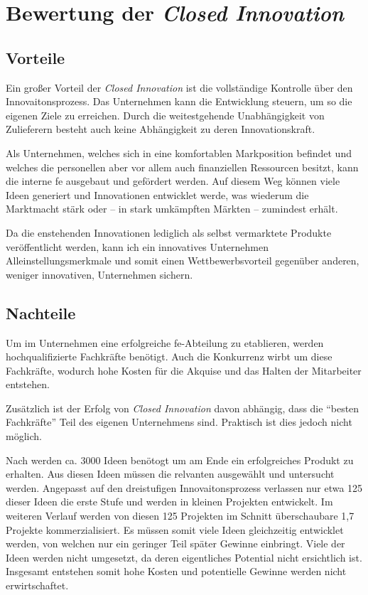 \section{Bewertung der \textit{Closed Innovation}}\label{sec:bewertung}


\subsection{Vorteile}\label{sec:bewertung-vor}
Ein großer Vorteil der \textit{Closed Innovation} ist die vollständige Kontrolle über den Innovaitonsprozess.
Das Unternehmen kann die Entwicklung steuern,
um so die eigenen Ziele zu erreichen.
Durch die weitestgehende Unabhängigkeit von Zulieferern besteht auch keine Abhängigkeit zu deren Innovationskraft.

Als Unternehmen, welches sich in eine komfortablen Markposition befindet
und welches die personellen aber vor allem auch finanziellen Ressourcen besitzt,
kann die interne \ac{fe} ausgebaut und gefördert werden.
Auf diesem Weg können viele Ideen generiert und Innovationen entwicklet werde,
was wiederum die Marktmacht stärk oder -- in stark umkämpften Märkten -- zumindest erhält.

Da die enstehenden Innovationen lediglich als selbst vermarktete Produkte veröffentlicht werden,
kann ich ein innovatives Unternehmen Alleinstellungsmerkmale und somit einen Wettbewerbsvorteil gegenüber anderen,
weniger innovativen, Unternehmen sichern.

\subsection{Nachteile}\label{sec:bewertung-nach}
Um im Unternehmen eine erfolgreiche \ac{fe}-Abteilung zu etablieren,
werden hochqualifizierte Fachkräfte benötigt.
Auch die Konkurrenz wirbt um diese Fachkräfte,
wodurch hohe Kosten für die Akquise und das Halten der Mitarbeiter entstehen.

Zusätzlich ist der Erfolg von \textit{Closed Innovation} davon abhängig,
dass die \enquote{besten Fachkräfte} Teil des eigenen Unternehmens sind.
Praktisch ist dies jedoch nicht möglich.

Nach \cite{stevens19973} werden ca. 3000 Ideen benötogt um am Ende ein erfolgreiches Produkt zu erhalten.
Aus diesen Ideen müssen die relvanten ausgewählt und untersucht werden.
Angepasst auf den dreistufigen Innovaitonsprozess verlassen nur etwa 125 dieser Ideen die erste Stufe
und werden in kleinen Projekten entwickelt.
Im weiteren Verlauf werden von diesen 125 Projekten im Schnitt überschaubare 1,7 Projekte kommerzialisiert.
Es müssen somit viele Ideen gleichzeitig entwicklet werden,
von welchen nur ein geringer Teil später Gewinne einbringt.
Viele der Ideen werden nicht umgesetzt, da deren eigentliches Potential nicht ersichtlich ist.
Insgesamt entstehen somit hohe Kosten und potentielle Gewinne werden nicht erwirtschaftet.

